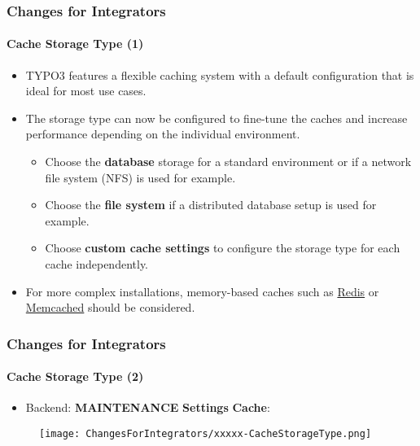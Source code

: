 \begin{frame}[fragile]
	\frametitle{Changes for Integrators}
	\framesubtitle{Cache Storage Type (1)}

	\begin{itemize}

		\item TYPO3 features a flexible caching system with a default configuration
			that is ideal for most use cases.
		\item The storage type can now be configured to fine-tune the caches and
			increase performance depending on the individual environment.

			\begin{itemize}
				\item Choose the \textbf{database} storage for a standard environment
					or if a network file system (NFS) is used for example.
				\item Choose the \textbf{file system} if a distributed database setup
					is used for example.
				\item Choose \textbf{custom cache settings} to configure the storage
					type for each cache independently.
			\end{itemize}

		\item For more complex installations, memory-based caches such as
			\href{https://redis.io/}{Redis}
			or
			\href{https://memcached.org/}{Memcached}
			should be considered.

	\end{itemize}

\end{frame}


\begin{frame}[fragile]
	\frametitle{Changes for Integrators}
	\framesubtitle{Cache Storage Type (2)}

	\begin{itemize}

		\item Backend: \textbf{MAINTENANCE} \hspace{0.1cm}\textbf{Settings} \hspace{0.1cm}\textbf{Cache}:
		\end{itemize}

	\begin{figure}
		\texttt{[image: ChangesForIntegrators/xxxxx-CacheStorageType.png]}
	\end{figure}

\end{frame}

